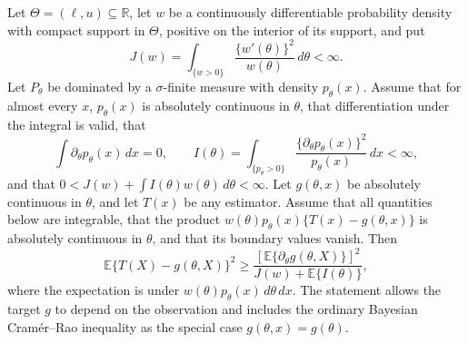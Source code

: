 Let \(\Theta=(\ell,u)\subseteq\mathbb R\), let \(w\) be a continuously differentiable probability density with compact support in \(\Theta\), positive on the interior of its support, and put
\[
 J(w)=\int_{\{w>0\}}\frac{\{w'(\theta)\}^2}{w(\theta)}\,d\theta<\infty.
\]
Let \(P_\theta\) be dominated by a \(\sigma\)-finite measure with density \(p_\theta(x)\). Assume that for almost every \(x\), \(p_\theta(x)\) is absolutely continuous in \(\theta\), that differentiation under the integral is valid, that
\[
 \int \partial_\theta p_\theta(x)\,dx=0,
 \qquad
 I(\theta)=\int_{\{p_\theta>0\}}
 \frac{\{\partial_\theta p_\theta(x)\}^2}{p_\theta(x)}\,dx<\infty,
\]
and that \(0<J(w)+\int I(\theta)w(\theta)\,d\theta<\infty\). Let \(g(\theta,x)\) be absolutely continuous in \(\theta\), and let \(T(x)\) be any estimator. Assume that all quantities below are integrable, that the product \(w(\theta)p_\theta(x)\{T(x)-g(\theta,x)\}\) is absolutely continuous in \(\theta\), and that its boundary values vanish. Then
\[
 \mathbb E\{T(X)-g(\theta,X)\}^2
 \geq
 \frac{\left[\mathbb E\{\partial_\theta g(\theta,X)\}\right]^2}
 {J(w)+\mathbb E\{I(\theta)\}},
\]
where the expectation is under \(w(\theta)p_\theta(x)\,d\theta\,dx\). The statement allows the target \(g\) to depend on the observation and includes the ordinary Bayesian Cram\'er--Rao inequality as the special case \(g(\theta,x)=g(\theta)\).